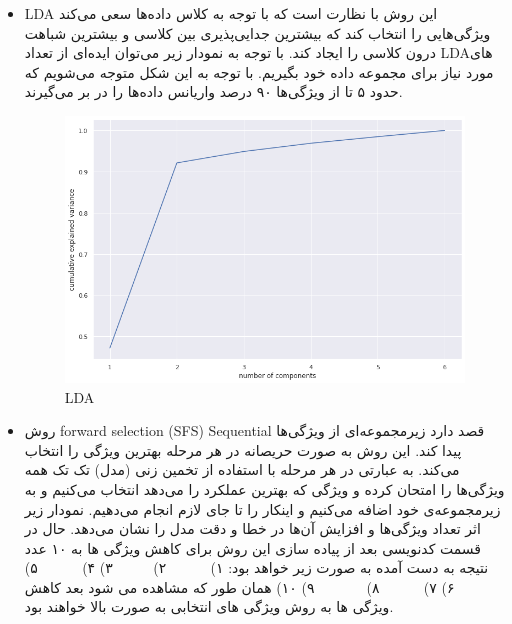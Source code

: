 \documentclass{article}
\begin{document}
\begin{itemize}
	 
	\item LDA \newline
	این روش با نظارت است که با توجه به کلاس داده‌ها سعی می‌کند ویژگی‌هایی را انتخاب کند که بیشترین جدایی‌پذیری بین کلاسی و بیشترین شباهت درون کلاسی را ایجاد کند. 
	با توجه به نمودار زیر ‌می‌توان ایده‌ای از تعداد LDAهای مورد نیاز برای مجموعه داده خود بگیریم.
	با توجه به این شکل متوجه می‌شویم که حدود ۵ تا از ويژگی‌ها ۹۰ درصد واریانس داده‌ها را در بر می‌گیرند. 
	 \begin{figure}[h]
		\centering
		\includegraphics[width=0.7\linewidth]{Photo/LDA}
		\caption[LDA]{LDA}
		\label{fig:lda}
	\end{figure}
	\item {} \newline
روش forward selection (SFS) Sequential قصد دارد زیرمجموعه‌ای از ویژگی‌ها پیدا کند. این روش به صورت حریصانه در هر مرحله بهترین ویژگی را انتخاب می‌کند. به عبارتی در هر مرحله با استفاده از تخمین زنی (مدل) تک تک همه ویژگی‌ها را امتحان کرده و ویژگی که بهترین عملکرد را می‌دهد انتخاب می‌کنیم و به زیرمجموعه‌ی خود اضافه می‌کنیم و اینکار را تا جای لازم انجام می‌دهیم. نمودار زیر اثر تعداد ویژگی‌ها و افزایش آن‌ها در خطا و دقت مدل را نشان می‌دهد.\newline
حال در قسمت کدنویسی بعد از پیاده سازی این روش برای کاهش ویژگی ها به ۱۰ عدد نتیجه به دست آمده به صورت زیر خواهد بود:
۱)  $\;\;\;\;\;\;\;\;\;$ ۲)  $\;\;\;\;\;\;\;\;$ ۳)  \newline
۴)  $\;\;\;\;\;\;\;\;\;$ ۵)  $\;\;\;\;\;\;\;\;\;\;\;$ ۶)  \newline
۷)  $\;\;\;\;\;\;\;\;\;$ ۸)  $\;\;\;\;\;\;\;\;\;\;\;$ ۹)  \newline
۱۰)  
همان طور که مشاهده می شود بعد کاهش ویژگی ها به روش  ویژگی های انتخابی به صورت بالا خواهند بود.\newline

\end{itemize}
\end{document}
